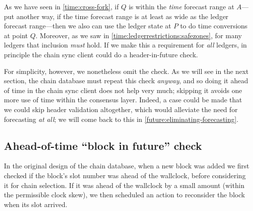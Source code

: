 \begin{center}
\end{center}

As we have seen in \cref{time:cross-fork}, if $Q$ is within the \emph{time}
forecast range at $A$---put another way, if the time forecast range is at least
as wide as the ledger forecast range---then we also can use the ledger state at
$P$ to do time conversions at point $Q$. Moreover, as we saw in
\cref{time:ledgerrestrictions:safezones}, for many ledgers that inclusion
\emph{must} hold. If we make this a requirement for \emph{all} ledgers, in
principle the chain sync client could do a header-in-future check.

For simplicity, however, we nonetheless omit the check. As we will see in the
next section, the chain database must repeat this check \emph{anyway}, and so
doing it ahead of time in the chain sync client does not help very much;
skipping it avoids one more use of time within the consensus layer. Indeed, a
case could be made that we could skip header validation altogether, which would
alleviate the need for forecasting \emph{at all}; we will come back to this in
\cref{future:eliminating-forecasting}.

\subsection{Ahead-of-time ``block in future'' check}
\label{time:block-infuture-check}

In the original design of the chain database, when a new block was added we
first checked if the block's slot number was ahead of the wallclock, before
considering it for chain selection. If it was ahead of the wallclock by a small
amount (within the permissible clock skew), we then scheduled an action to
reconsider the block when its slot arrived.

